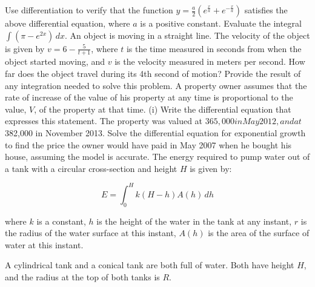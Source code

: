 \documentclass[12pt,addpoints]{exam}
\begin{document}
\begin{questions}
Use differentiation to verify that the function \( y = \frac{a}{2} \left( e^{\frac{x}{a}} + e^{-\frac{x}{a}} \right) \) satisfies the above differential equation, where \( a \) is a positive constant.
\fillwithlines{3cm}
\question[5] Evaluate the integral \(\int (\pi - e^{2x}) \, dx\).
\fillwithlines{3cm}
\question[5] An object is moving in a straight line. The velocity of the object is given by \(v = 6 - \frac{5}{t+1}\), where \(t\) is the time measured in seconds from when the object started moving, and \(v\) is the velocity measured in meters per second. How far does the object travel during its 4th second of motion? Provide the result of any integration needed to solve this problem.
\fillwithlines{3cm}
\question[5] A property owner assumes that the rate of increase of the value of his property at any time is proportional to the value, \( V \), of the property at that time. (i) Write the differential equation that expresses this statement.
\fillwithlines{3cm}
\question[5] The property was valued at $365,000 in May 2012, and at $382,000 in November 2013. Solve the differential equation for exponential growth to find the price the owner would have paid in May 2007 when he bought his house, assuming the model is accurate.
\fillwithlines{3cm}
\question[5] The energy required to pump water out of a tank with a circular cross-section and height \( H \) is given by:

\[ 
E = \int_0^H k(H-h)A(h) \, dh 
\]

where  
\( k \) is a constant,  
\( h \) is the height of the water in the tank at any instant,  
\( r \) is the radius of the water surface at this instant,  
\( A(h) \) is the area of the surface of water at this instant.

A cylindrical tank and a conical tank are both full of water. Both have height \( H \), and the radius at the top of both tanks is \( R \).


\end{questions}
\end{document}

